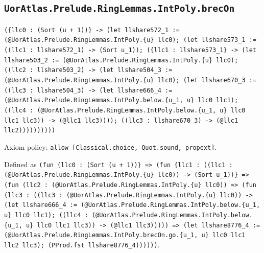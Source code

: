 \documentclass[11pt]{article}
\begin{document}
\subsection*{\texttt{UorAtlas.Prelude.RingLemmas.IntPoly.brecOn}}
\noindent\texttt{(\{llc0 : (Sort (u + 1))\} -> (let llshare572\_1 := (@UorAtlas.Prelude.RingLemmas.IntPoly.\{u\} llc0); (let llshare573\_1 := ((llc1 : llshare572\_1) -> (Sort u\_1)); (\{llc1 : llshare573\_1\} -> (let llshare503\_2 := (@UorAtlas.Prelude.RingLemmas.IntPoly.\{u\} llc0); ((llc2 : llshare503\_2) -> (let llshare504\_3 := (@UorAtlas.Prelude.RingLemmas.IntPoly.\{u\} llc0); (let llshare670\_3 := ((llc3 : llshare504\_3) -> (let llshare666\_4 := (@UorAtlas.Prelude.RingLemmas.IntPoly.below.\{u\_1, u\} llc0 llc1); ((llc4 : (@UorAtlas.Prelude.RingLemmas.IntPoly.below.\{u\_1, u\} llc0 llc1 llc3)) -> (@llc1 llc3)))); ((llc3 : llshare670\_3) -> (@llc1 llc2))))))))))}\par
\noindent Axiom policy: \texttt{allow [Classical.choice, Quot.sound, propext]}.\par
\noindent Defined as \texttt{(fun \{llc0 : (Sort (u + 1))\} => (fun \{llc1 : ((llc1 : (@UorAtlas.Prelude.RingLemmas.IntPoly.\{u\} llc0)) -> (Sort u\_1))\} => (fun (llc2 : (@UorAtlas.Prelude.RingLemmas.IntPoly.\{u\} llc0)) => (fun (llc3 : ((llc3 : (@UorAtlas.Prelude.RingLemmas.IntPoly.\{u\} llc0)) -> (let llshare666\_4 := (@UorAtlas.Prelude.RingLemmas.IntPoly.below.\{u\_1, u\} llc0 llc1); ((llc4 : (@UorAtlas.Prelude.RingLemmas.IntPoly.below.\{u\_1, u\} llc0 llc1 llc3)) -> (@llc1 llc3))))) => (let llshare8776\_4 := (@UorAtlas.Prelude.RingLemmas.IntPoly.brecOn.go.\{u\_1, u\} llc0 llc1 llc2 llc3); (PProd.fst llshare8776\_4))))))}.\par
\end{document}

